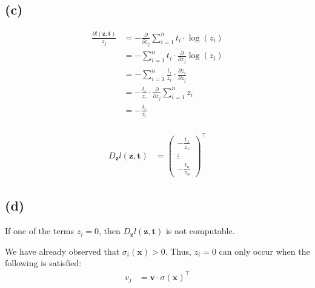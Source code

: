 \subsection*{(c)}
\begin{align*}
\frac{\partial l(\boldsymbol{z}, \boldsymbol{t})}{z_j} &= - \frac{\partial}{\partial z_j} \sum_{i=1}^n t_i \cdot \log(z_i) \\
&= - \sum_{i=1}^n t_i \cdot \frac{\partial}{\partial z_j} \log(z_i) \\
&= - \sum_{i=1}^n \frac{t_i}{z_i} \cdot \frac{\partial z_i}{\partial z_j} \\
&= - \frac{t_i}{z_i} \cdot \frac{\partial}{\partial z_j} \sum_{i=1}^n z_i \\
&= - \frac{t_i}{z_i} \\
\end{align*}


\begin{align*}
D_{\boldsymbol{z}}l(\boldsymbol{z}, \boldsymbol{t})
&=
\begin{pmatrix}
- \frac{t_1}{z_1} \\
\vdots \\
- \frac{t_n}{z_n}
\end{pmatrix}^\top
\end{align*}

\subsection*{(d)}
If one of the terms $z_i = 0$, then $D_{\boldsymbol{z}}l(\boldsymbol{z}, \boldsymbol{t})$ is not computable.

We have already observed that $\sigma_i(\boldsymbol{x}) > 0$. Thus, $z_i = 0$ can only occur when the following is satisfied:
\begin{align*}
v_j &= \boldsymbol{v} \cdot \sigma(\boldsymbol{x})^\top
\end{align*}